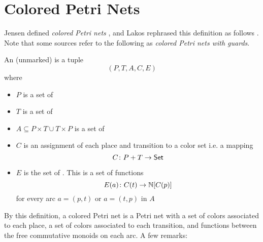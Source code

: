 \section{Colored Petri Nets}\label{sec:coloredpetri}

Jensen defined \emph{colored Petri nets} \cite{jensen}, and Lakos rephrased this definition as follows \cite{lakosabstraction}. Note that some sources refer to the following as \emph{colored Petri nets with guards}. 

\begin{defn}
    An (unmarked)  is a tuple \[(P, T, A, C, E)\] where
    \begin{itemize}
        \item $P$ is a set of 
        \item $T$ is a set of 
        \item $A \subseteq P \times T \cup T \times P$ is a set of 
        \item $C$ is an assignment of each place and transition to a color set i.e. a mapping 
        \[C \colon P + T \to \mathsf{Set}\]
        \item $E$ is the set of . This is a set of functions
        \[E(a)\colon C(t) \to \mathbb{N}[C(p)] \]
        for every arc $a=(p, t)$ or $a=(t, p)$ in $A$
        \end{itemize}
\end{defn}
\noindent By this definition, a colored Petri net is a Petri net with a set of colors associated to each place, a set of colors associated to each transition, and functions between the free commutative monoids on each arc. A few remarks:


